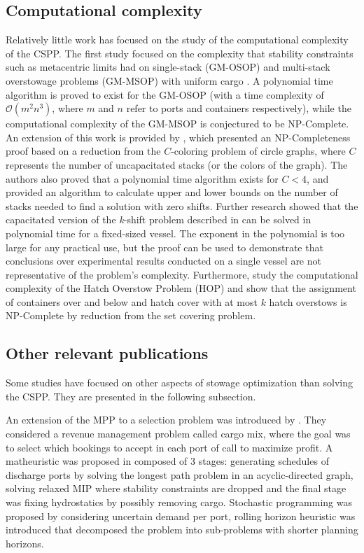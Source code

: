 \documentclass[preprint,12pt,authoryear]{elsarticle}
\begin{document}
\subsection{Computational complexity} \label{sec:computational_complexity}
Relatively little work has focused on the study of the computational complexity of the CSPP. The first study focused on the complexity that stability constraints such as metacentric limits had on single-stack (GM-OSOP) and multi-stack overstowage problems (GM-MSOP) with uniform cargo \citep{Aslidis1989CombinatorialProblems}. A polynomial time algorithm is proved to exist for the GM-OSOP (with a time complexity of $\mathcal{O}(m^2n^3)$, where $m$ and $n$ refer to ports and containers respectively), while the computational complexity of the GM-MSOP is conjectured to be NP-Complete. An extension of this work is provided by \cite{Avriel2000ContainerGraphs}, which presented an NP-Completeness proof based on a reduction from the $C$-coloring problem of circle graphs, where $C$ represents the number of uncapacitated stacks (or the colors of the graph). The authors also proved that a polynomial time algorithm exists for $C<4$, and provided an algorithm to calculate upper and lower bounds on the number of stacks needed to find a solution with zero shifts. Further research \citep{Tierney2014OnProblems} showed that the capacitated version of the {\em k}-shift problem described in \cite{Avriel2000ContainerGraphs} can be solved in polynomial time for a fixed-sized vessel. The exponent in the polynomial is too large for any practical use, but the proof can be used to demonstrate that conclusions over experimental results conducted on a single vessel are not representative of the problem's complexity. Furthermore, \cite{Tierney2014OnProblems} study the computational complexity of the Hatch Overstow Problem (HOP) and show that the assignment of containers over and below and hatch cover with at most $k$ hatch overstows is NP-Complete by reduction from the set covering problem.  

\subsection{Other relevant publications}
\label{sec:misc}
Some studies have focused on other aspects of stowage optimization than solving the CSPP. They are presented in the following subsection.

An extension of the MPP to a selection problem was introduced by \cite{Christensen2017AStowage, Christensen2019AProblem, Kebedow2019IncludingStowage}. They considered a revenue management problem called cargo mix, where the goal was to select which bookings to accept in each port of call to maximize profit. A matheuristic was proposed in \cite{Christensen2017AStowage} composed of 3 stages: generating schedules of discharge ports by solving the longest path problem in an acyclic-directed graph, solving relaxed MIP where stability constraints are dropped and the final stage was fixing hydrostatics by possibly removing cargo. Stochastic programming was proposed by \cite{Christensen2019AProblem} considering uncertain demand per port, rolling horizon heuristic was introduced that decomposed the problem into sub-problems with shorter planning horizons.
\end{document}
